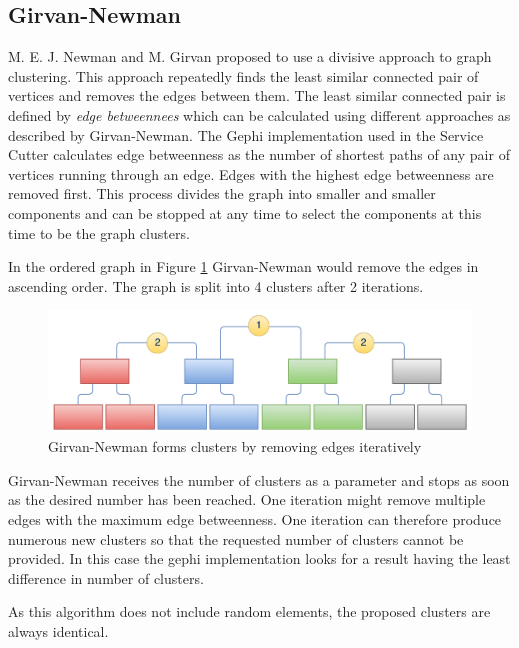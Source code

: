 \subsection{Girvan-Newman}
\label{subsec:girvanNewman}
	

M. E. J. Newman and M. Girvan\cite{girvan} proposed to use a divisive approach to graph clustering. This approach repeatedly finds the least similar connected pair of vertices and removes the edges between them. The least similar connected pair is defined by \textit{edge betweennees} which can be calculated using different approaches as described by Girvan-Newman. The Gephi implementation used in the Service Cutter calculates edge betweenness as the number of shortest paths of any pair of vertices running through an edge. Edges with the highest edge betweenness are removed first. This process divides the graph into smaller and smaller components and can be stopped at any time to select the components at this time to be the graph clusters.

In the ordered graph in Figure \ref{fig:girvan-newman-process} Girvan-Newman would remove the edges in ascending order. The graph is split into 4 clusters after 2 iterations.

\begin{figure}[H]
	\begin{center}
		\includegraphics[scale=0.45]{diagrams/Girvan-Newman-Process.pdf}
	\end{center}
	\caption{Girvan-Newman forms clusters by removing edges iteratively}
	\label{fig:girvan-newman-process}
\end{figure}

Girvan-Newman receives the number of clusters as a parameter and stops as soon as the desired number has been reached. One iteration might remove multiple edges with the maximum edge betweenness. One iteration can therefore produce numerous new clusters so that the requested number of clusters cannot be provided. In this case the gephi implementation looks for a result having the least difference in number of clusters. 

As this algorithm does not include random elements, the proposed clusters are always identical.

